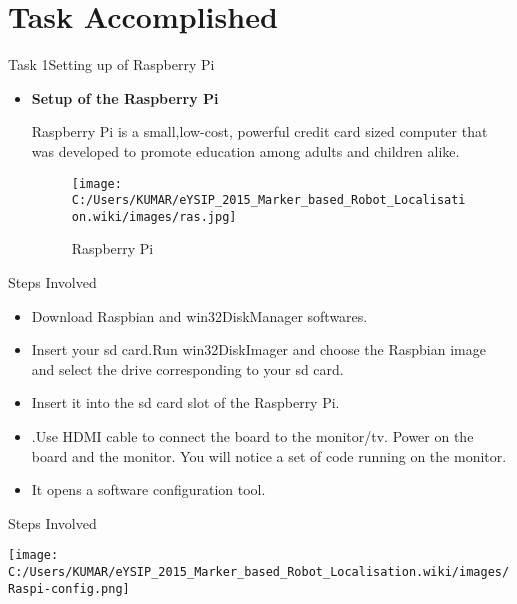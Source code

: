 \documentclass[10pt, a4paper]{beamer}
\begin{document}
\section{Task Accomplished}
\begin{frame}{Task 1}{Setting up of Raspberry Pi}
	\pause
	\begin{itemize}
		\item \textbf{Setup of the Raspberry Pi}\\
		\pause
		\begin{block}{Raspberry Pi is a small,low-cost, powerful credit card sized computer that was developed to promote education among adults and children alike.}
		\end{block}
		\pause
         \centering
		\begin{figure}[!htb]
			\begin{minipage}{0.5\textwidth}
				\centering
		    	\texttt{[image: C:/Users/KUMAR/eYSIP\_2015\_Marker\_based\_Robot\_Localisation.wiki/images/ras.jpg]}
		    	
		    \label{fig:sfig2}
		    \end{minipage}
		    \centering
		    \caption{Raspberry Pi}
		    \label{fig:fig}
		
	\end{figure}	
		
		
	 \end{itemize}
	 
\end{frame}


\begin{frame}{Steps Involved}
	\begin{itemize}
	  	\item Download Raspbian and win32DiskManager softwares.
	  	\item  Insert your sd card.Run win32DiskImager and choose the Raspbian image and select the drive corresponding to your sd card. 
	  	\item Insert it into the sd card slot of the Raspberry Pi.
	  	\item .Use HDMI cable to connect the board to the monitor/tv.
	  	Power on the board and the monitor. You will notice a set of code running on the monitor.
	  	\item  It opens a software configuration tool.
	    
	\end{itemize}
\end{frame}

\begin{frame}{Steps Involved}
	
		\begin{minipage}{0.5\textwidth}
			\centering
			\texttt{[image: C:/Users/KUMAR/eYSIP\_2015\_Marker\_based\_Robot\_Localisation.wiki/images/Raspi-config.png]}
			\label{fig:sfig2}
		\end{minipage}
	
\end{frame}
\end{document}
